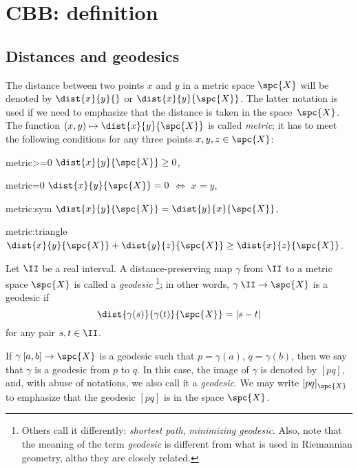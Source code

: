 \chapter{CBB: definition}

\section{Distances and geodesics}

The distance between two points $x$ and $y$ in a metric space $\spc{X}$ will be denoted by $\dist{x}{y}{}$ or $\dist{x}{y}{\spc{X}}$.
The latter notation is used if we need to emphasize 
that the distance is taken in the space~${\spc{X}}$.
The function $(x,y)\mapsto \dist{x}{y}{\spc{X}}$ is called \emph{metric};
it has to meet the following conditions for any three points $x,y,z\in \spc{X}$:

\begin{subthm}{metric>=0}
$\dist{x}{y}{\spc{X}}\ge 0$,
\end{subthm}

\begin{subthm}{metric=0} $\dist{x}{y}{\spc{X}}= 0$ $\iff$ $x=y$,
\end{subthm}

\begin{subthm}{metric:sym} $\dist{x}{y}{\spc{X}}=\dist{y}{x}{\spc{X}}$,
\end{subthm}

\begin{subthm}{metric:triangle} $\dist{x}{y}{\spc{X}}+\dist{y}{z}{\spc{X}}\ge\dist{x}{z}{\spc{X}}$.
\end{subthm}

Let $\II$\index{$\II$} be a real interval. 
A distance-preserving map $\gamma$ from $\II$ to a metric space $\spc{X}$ is called a \emph{geodesic}%
\footnote{Others call it differently: \textit{shortest path}, \textit{minimizing geodesic}.
Also, note that the meaning of the term \textit{geodesic} is different from what is used in Riemannian geometry, altho they are closely related.}; 
in other words, $\gamma\:\II\to \spc{X}$ is a geodesic if 
\[\dist{\gamma(s)}{\gamma(t)}{\spc{X}}=|s-t|\]
for any pair $s,t\in \II$.

If $\gamma\:[a,b]\to \spc{X}$ is a geodesic such that $p=\gamma(a)$, $q=\gamma(b)$, then we say that $\gamma$ is a geodesic from $p$ to $q$.
In this case, the image of $\gamma$ is denoted by $[p q]$\index{$[{*}{*}]$}, and, with abuse of notations, we also call it a \emph{geodesic}.
We may write $[p q]_{\spc{X}}$ 
to emphasize that the geodesic $[p q]$ is in the space  ${\spc{X}}$.


